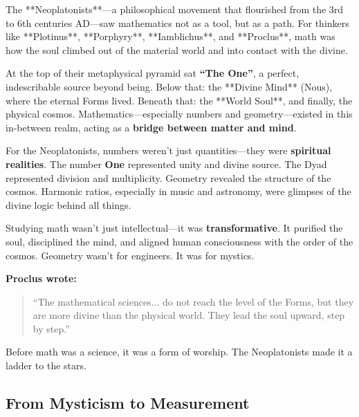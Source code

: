 \begin{tcolorbox}[colback=blue!5!white, colframe=blue!50!black, 
    title={Historical Sidebar: Neoplatonism—Mathematics as the Ascent to the Divine}]
    
        The **Neoplatonists**—a philosophical movement that flourished from the 3rd to 6th centuries AD—saw mathematics not as a tool, but as a path. For thinkers like **Plotinus**, **Porphyry**, **Iamblichus**, and **Proclus**, math was how the soul climbed out of the material world and into contact with the divine.
    
        \medskip
    
        At the top of their metaphysical pyramid sat \textbf{“The One”}, a perfect, indescribable source beyond being. Below that: the **Divine Mind** (Nous), where the eternal Forms lived. Beneath that: the **World Soul**, and finally, the physical cosmos. Mathematics—especially numbers and geometry—existed in this in-between realm, acting as a \textbf{bridge between matter and mind}.
    
        \medskip
    
        For the Neoplatonists, numbers weren’t just quantities—they were \textbf{spiritual realities}. The number \textbf{One} represented unity and divine source. The Dyad represented division and multiplicity. Geometry revealed the structure of the cosmos. Harmonic ratios, especially in music and astronomy, were glimpses of the divine logic behind all things.
    
        \medskip
    
        Studying math wasn’t just intellectual—it was \textbf{transformative}. It purified the soul, disciplined the mind, and aligned human consciousness with the order of the cosmos. Geometry wasn’t for engineers. It was for mystics.
    
        \medskip
    
        \textbf{Proclus wrote:}
        \begin{quote}
        “The mathematical sciences... do not reach the level of the Forms, but they are more divine than the physical world. They lead the soul upward, step by step.”
        \end{quote}
    
        Before math was a science, it was a form of worship. The Neoplatonists made it a ladder to the stars.
    
\end{tcolorbox}


\subsection{From Mysticism to Measurement}


